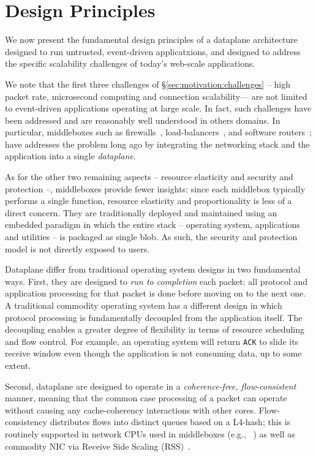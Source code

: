 \section{\ix Design Principles}
\label{sec:design}

We now present the fundamental design principles of a dataplane
architecture designed to run untrusted, event-driven applicatxions, and
designed to address the specific scalability challenges of today's
web-scale applications.

We note that the first three challenges of
\S\ref{sec:motivation:challenges} -- high packet rate, microsecond
computing and connection scalability--- are not limited to
event-driven applications operating at large scale.  In fact, such
challenges have been addressed and are reasonably well understood in
others domains.  In particular, middleboxes such as
firewalls~\cite{missing}, load-balancers~\cite{missing}, and software
routers~\cite{DBLP:journals/tocs/KohlerMCJK00,DBLP:conf/sosp/DobrescuEACFIKMR09};
have addresses the problem long ago by integrating the networking
stack and the application into a single \emph{dataplane}.  

As for the other two remaining aspects -- resource elasticity and
security and protection --, middleboxes provide fewer insights: since
each middlebox typically performs a single function, resource
elasticity and proportionality is less of a direct concern.  They are
traditionally deployed and maintained using an embedded paradigm in
which the entire stack -- operating system, applications and utilities
-- is packaged as single blob.  As such, the security and protection
model is not directly exposed to users.

Dataplane differ from traditional operating system designs in two
fundamental ways. First, they are designed to \emph{run to completion}
each packet: all protocol and application processing for that packet
is done before moving on to the next one.  A traditional commodity
operating system has a different design in which protocol processing
is fundamentally decoupled from the application itself.  The
decoupling enables a greater degree of flexibility in terms of resource
scheduling and flow control.  For example, an operating system will
return \texttt{ACK} to slide its receive window even though the
application is not consuming data, up to some extent.

Second, dataplane are designed to operate in a \emph{coherence-free,
  flow-consistent} manner, meaning that the common case processing of
a packet can operate without causing any cache-coherency interactions
with other cores.  Flow-consistency distributes flows into distinct
queues based on a L4-hash; this is routinely supported in network CPUs
used in middleboxes (e.g., ~\cite{cavium-octeon}) as well as commodity
NIC via Receive Side Scaling (RSS)~\cite{missing}.

